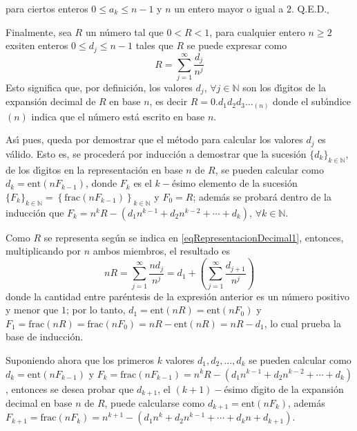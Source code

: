 \begin{solucion}
\begin{demostracion}
\begin{equation*}
  \end{equation*}
  para ciertos enteros $0 \leq a_k \leq n-1$ y $n$ un entero mayor o igual a $2$. Q.E.D.${}_{\square}$
 \end{demostracion}
 Finalmente, sea $R$ un n\'umero tal que $0 < R < 1$, para cualquier entero $n \geq 2$ exsiten enteros $0 \leq  d_j \leq n-1$ tales que $R$ se puede expresar como
 \begin{equation} \label{eqRepresentacionDecimal1}
  R = \sum_{j=1}^{\infty} \frac{d_j}{n^j}
 \end{equation}
 Esto significa que, por definici\'on, los valores $d_j$, $\forall j \in \mathbb{N}$ son los d\'{\i}gitos de la expansi\'on decimal de $R$ en base $n$, es decir $R = 0.d_1d_2d_3\ldots_{(n)}$ donde el sub\'{\i}ndice $(n)$ indica que el n\'umero est\'a escrito en base $n$.
 \par 
 As\'{\i} pues, queda por demostrar que el m\'etodo para calcular los valores $d_j$ es v\'alido. Esto es, se proceder\'a por inducci\'on a demostrar que la sucesi\'on $\{ d_k \}_{k\in\mathbb{N}}$, de los d\'{\i}gitos en la representaci\'on en base $n$ de $R$, se pueden calcular como $d_k = \text{ent}(nF_{k-1})$, donde $F_k$ es el $k-$\'esimo elemento de la sucesi\'on $\{F_k\}_{k\in\mathbb{N}} = \left\{ \text{frac}(nF_{k-1}) \right\}_{k\in\mathbb{N}}$ y $F_0 = R$; adem\'as se probar\'a dentro de la inducci\'on que $F_{k} = n^{k} R - \left( d_1n^{k-1} + d_2n^{k-2} + \cdots + d_{k} \right)$, $\forall k \in \mathbb{N}$.
 \par 
 Como $R$ se representa seg\'un se indica en \eqref{eqRepresentacionDecimal1}, entonces, multiplicando por $n$ ambos miembros, el resultado es
 \begin{equation*}
  nR = \sum_{j=1}^{\infty} \frac{nd_j}{n^j} = d_1 +  \left( \sum_{j=1}^{\infty} \frac{d_{j+1}}{n^j} \right)
 \end{equation*}
 donde la cantidad entre par\'entesis de la expresi\'on anterior es un n\'umero positivo y menor que $1$; por lo tanto, $d_1 = \text{ent}(nR) = \text{ent}(nF_0)$ y $F_1 = \text{frac}(nR) = \text{frac}(nF_0) = nR - \text{ent}(nR) = nR - d_1$, lo cual prueba la base de inducci\'on.
 \par 
 Suponiendo ahora que los primeros $k$ valores $d_1, d_2, \ldots, d_k$ se pueden calcular como $d_{k} = \text{ent}(nF_{k-1})$ y $F_{k} = \text{frac}(nF_{k-1}) = n^{k}R - \left( d_1n^{k-1} + d_2n^{k-2} + \cdots + d_k \right)$, entonces se desea probar que $d_{k+1}$, el $(k+1)-$\'esimo d\'{\i}gito de la expansi\'on decimal en base $n$ de $R$, puede calcularse como $d_{k+1}=\text{ent}(nF_k)$, adem\'as $F_{k+1} = \text{frac}(nF_k) = n^{k+1} - \left( d_1n^{k} + d_2n^{k-1} + \cdots + d_kn + d_{k+1} \right)$.

\end{solucion}
